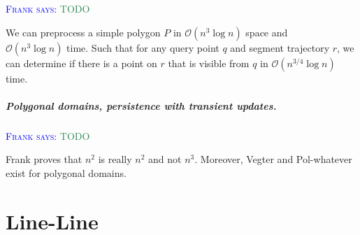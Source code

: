 \documentclass[UKenglish]{lipics-v2019}
\newcommand{\myremark}[4]{\textcolor{blue}{\textsc{#1 #2:}} \textcolor{#4}{\textsf{#3}}}
\newcommand{\frank}[2][says]{\myremark{Frank}{#1}{#2}{SeaGreen}}
\begin{document}
\frank{TODO}



\begin{theorem}
  We can preprocess a simple polygon $P$ in $\mathcal{O}( n^3 \log n)$ space and \\ $\mathcal{O}(n^3 \log n)$ time. Such that for any query point $q$ and segment trajectory $r$, we can determine if there is a point on $r$ that is visible from $q$ in $\mathcal{O}(n^{3/4} \log n)$ time.
\end{theorem}




\subparagraph{Polygonal domains, persistence with transient updates.}

\frank{TODO}

Frank proves that $n^2$ is really $n^2$ and not $n^3$. Moreover, Vegter and Pol-whatever exist for polygonal domains.


\section{Line-Line}
\label{sec:lineline}
\end{document}
